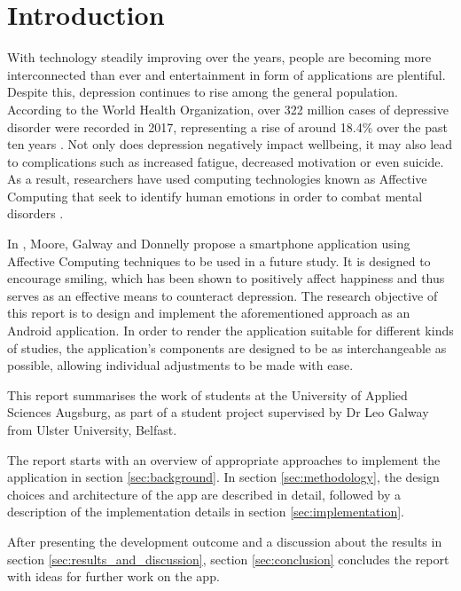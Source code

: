 \section{Introduction} \label{sec:introduction}
With technology steadily improving over the years, people are becoming more interconnected than ever and entertainment in form of applications are plentiful. Despite this, depression continues to rise among the general population.
According to the World Health Organization, over 322 million cases of depressive disorder were recorded in 2017, representing a rise of around 18.4\% over the past ten years \cite{who_depression}.
Not only does depression negatively impact wellbeing, it may also lead to complications such as increased fatigue, decreased motivation or even suicide.
As a result, researchers have used computing technologies known as Affective Computing that seek to identify human emotions in order to combat mental disorders \cite{ieee_affective}.

In \cite{sohappy}, Moore, Galway and Donnelly propose a smartphone application using Affective Computing techniques to be used in a future study.
It is designed to encourage smiling, which has been shown to positively affect happiness and thus serves as an effective means to counteract depression.
The research objective of this report is to design and implement the aforementioned approach as an Android application.
In order to render the application suitable for different kinds of studies, the application's components are designed to be as interchangeable as possible, allowing individual adjustments to be made with ease.

This report summarises the work of students at the University of Applied 
Sciences Augsburg, as part of a student project supervised by Dr Leo Galway
from Ulster University, Belfast.

The report starts with an overview of appropriate approaches to implement the 
application in section \ref{sec:background}. In section \ref{sec:methodology}, 
the design choices and architecture of the app are described in detail, followed 
by a description of the implementation details in section \ref{sec:implementation}.

After presenting the development outcome and a discussion about the results in
section \ref{sec:results_and_discussion}, section \ref{sec:conclusion}
concludes the report with ideas for further work on the app.

